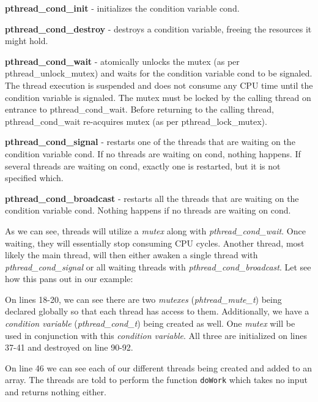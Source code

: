 \documentclass[../main.tex]{subfiles}
\begin{document}
	\textbf{pthread\_cond\_init} - initializes the condition variable cond.
		
	\textbf{pthread\_cond\_destroy} - destroys a condition variable, freeing the resources it might hold.
		
	\textbf{pthread\_cond\_wait} - atomically unlocks the mutex (as per pthread\_unlock\_mutex) and waits for the condition variable cond to be signaled. The thread execution is suspended and does not consume any  CPU	time  until the condition variable is signaled. The mutex must be locked by the calling thread on entrance to pthread\_cond\_wait. Before returning to the calling thread, pthread\_cond\_wait re-acquires mutex (as per pthread\_lock\_mutex).
		
	\textbf{pthread\_cond\_signal} - restarts  one of the threads that are waiting on the condition variable cond. If no threads are waiting on cond, nothing happens. If several threads are waiting on cond, exactly one is restarted, but it is not specified which.
		
	\textbf{pthread\_cond\_broadcast} - restarts all the threads that are waiting on the condition variable cond. Nothing happens if no threads are waiting on cond.

	As we can see, threads will utilize a \textit{mutex} along with \textit{pthread\_cond\_wait}.  Once waiting, they will essentially stop consuming CPU cycles.  Another thread, most likely the main thread, will then either awaken a single thread with \textit{pthread\_cond\_signal} or all waiting threads with \textit{pthread\_cond\_broadcast}.  Let see how this pans out in our example:\\
	
	
	On lines 18-20, we can see there are two \textit{mutexes} (\textit{phtread\_mute\_t}) being declared globally so that each thread has access to them.  Additionally, we have a \textit{condition variable} (\textit{pthread\_cond\_t}) being created as well.  One \textit{mutex} will be used in conjunction with this \textit{condition variable}. All three are initialized on lines 37-41 and destroyed on line 90-92.
	
	On line 46 we can see each of our different threads being created and added to an array.  The threads are told to perform the function \texttt{doWork} which takes no input and returns nothing either.
	
\end{document}
